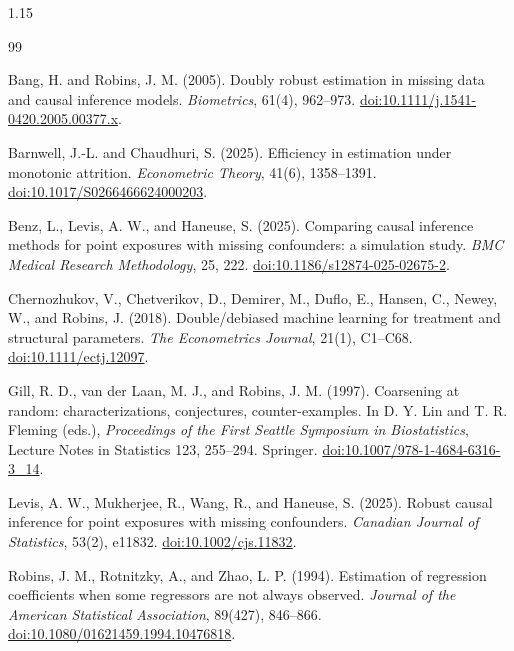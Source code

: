 \documentclass[11pt]{article}
\theoremstyle{definition}
\newcommand{\1}{\mathbf{1}}
\begin{document}
\begingroup
\small
\begin{spacing}{1.15}
\setlength{\bibsep}{5pt}
\begin{thebibliography}{99}

Bang, H. and Robins, J. M. (2005).
Doubly robust estimation in missing data and causal inference models.
\emph{Biometrics}, 61(4), 962--973.
\href{https://doi.org/10.1111/j.1541-0420.2005.00377.x}{doi:10.1111/j.1541-0420.2005.00377.x}.

Barnwell, J.-L. and Chaudhuri, S. (2025).
Efficiency in estimation under monotonic attrition.
\emph{Econometric Theory}, 41(6), 1358--1391.
\href{https://doi.org/10.1017/S0266466624000203}{doi:10.1017/S0266466624000203}.

Benz, L., Levis, A. W., and Haneuse, S. (2025).
Comparing causal inference methods for point exposures with missing confounders: a simulation study.
\emph{BMC Medical Research Methodology}, 25, 222.
\href{https://doi.org/10.1186/s12874-025-02675-2}{doi:10.1186/s12874-025-02675-2}.

Chernozhukov, V., Chetverikov, D., Demirer, M., Duflo, E., Hansen, C., Newey, W., and Robins, J. (2018).
Double/debiased machine learning for treatment and structural parameters.
\emph{The Econometrics Journal}, 21(1), C1--C68.
\href{https://doi.org/10.1111/ectj.12097}{doi:10.1111/ectj.12097}.

Gill, R. D., van der Laan, M. J., and Robins, J. M. (1997).
Coarsening at random: characterizations, conjectures, counter-examples.
In D. Y. Lin and T. R. Fleming (eds.), \emph{Proceedings of the First Seattle Symposium in Biostatistics}, Lecture Notes in Statistics 123, 255--294. Springer.
\href{https://doi.org/10.1007/978-1-4684-6316-3_14}{doi:10.1007/978-1-4684-6316-3\_14}.

Levis, A. W., Mukherjee, R., Wang, R., and Haneuse, S. (2025).
Robust causal inference for point exposures with missing confounders.
\emph{Canadian Journal of Statistics}, 53(2), e11832.
\href{https://doi.org/10.1002/cjs.11832}{doi:10.1002/cjs.11832}.

Robins, J. M., Rotnitzky, A., and Zhao, L. P. (1994).
Estimation of regression coefficients when some regressors are not always observed.
\emph{Journal of the American Statistical Association}, 89(427), 846--866.
\href{https://doi.org/10.1080/01621459.1994.10476818}{doi:10.1080/01621459.1994.10476818}.


\end{thebibliography}
\end{spacing}
\end{document}
